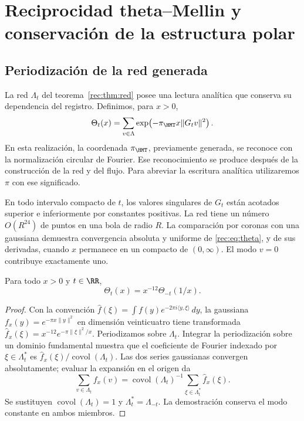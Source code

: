 \section{Reciprocidad theta--Mellin y conservación de la estructura polar}
\label{rec:espectral}

\subsection{Periodización de la red generada}

La red \(\Lambda_t\) del teorema~\ref{rec:thm:red} posee una lectura analítica que conserva su dependencia del registro. Definimos, para \(x>0\),
\begin{equation}
 \Theta_t(x)=\sum_{v\in\Lambda}
       \exp\!\left(-\pi_{\HMT}x\|G_tv\|^2\right).
 \label{rec:eq:theta}
\end{equation}
En esta realización, la coordenada \(\pi_{\HMT}\), previamente generada, se reconoce con la normalización circular de Fourier. Ese reconocimiento se produce después de la construcción de la red y del flujo. Para abreviar la escritura analítica utilizaremos \(\pi\) con ese significado.

En todo intervalo compacto de \(t\), los valores singulares de \(G_t\) están acotados superior e inferiormente por constantes positivas. La red tiene un número \(O(R^{24})\) de puntos en una bola de radio \(R\). La comparación por coronas con una gaussiana demuestra convergencia absoluta y uniforme de \eqref{rec:eq:theta}, y de sus derivadas, cuando \(x\) permanece en un compacto de \((0,\infty)\). El modo \(v=0\) contribuye exactamente uno.

\begin{theorem}
\label{rec:thm:theta}
Para todo \(x>0\) y \(t\in\RR\),
\begin{equation}
 \Theta_t(x)=x^{-12}\Theta_{-t}(1/x).
 \label{rec:eq:theta-reciproca}
\end{equation}
\end{theorem}
\begin{proof}
Con la convención \(\widehat f(\xi)=\int f(y)e^{-2\pi i\langle y,\xi\rangle}\,dy\), la gaussiana \(f_x(y)=e^{-\pi x\|y\|^2}\) en dimensión veinticuatro tiene transformada
\(\widehat f_x(\xi)=x^{-12}e^{-\pi\|\xi\|^2/x}\).
Periodizamos sobre \(\Lambda_t\). Integrar la periodización sobre un dominio fundamental muestra que el coeficiente de Fourier indexado por \(\xi\in\Lambda_t^*\) es \(\widehat f_x(\xi)/\operatorname{covol}(\Lambda_t)\). Las dos series gaussianas convergen absolutamente; evaluar la expansión en el origen da
\[
 \sum_{v\in\Lambda_t}f_x(v)
 =\operatorname{covol}(\Lambda_t)^{-1}
   \sum_{\xi\in\Lambda_t^*}\widehat f_x(\xi).
\]
Se sustituyen \(\operatorname{covol}(\Lambda_t)=1\) y \(\Lambda_t^*=\Lambda_{-t}\). La demostración conserva el modo constante en ambos miembros.
\end{proof}

